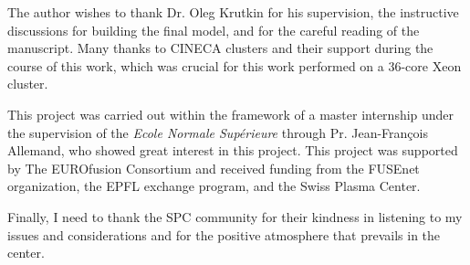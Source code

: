 \documentclass[11pt,a4paper,openany]{report}
\begin{document}
\begin{multicols}{2}
    The author wishes to thank Dr. Oleg Krutkin for his supervision, the instructive discussions for building the final model, and for the careful reading of the manuscript. Many thanks to CINECA clusters and their support during the course of this work, which was crucial for this work performed on a 36-core Xeon cluster.

    This project was carried out within the framework of a master internship under the supervision of the \textit{Ecole Normale Supérieure} through Pr. Jean-François Allemand, who showed great interest in this project. This project was supported by The EUROfusion Consortium and received funding from the FUSEnet organization, the EPFL exchange program, and the Swiss Plasma Center.

    Finally, I need to thank the SPC community for their kindness in listening to my issues and considerations and for the positive atmosphere that prevails in the center.

    \nocite{*}
    \printbibliography
\end{multicols}
\end{document}
